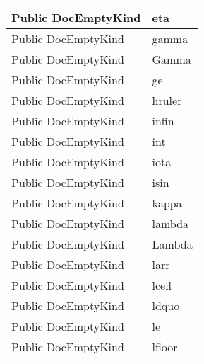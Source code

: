 \documentclass[11pt, oneside, a4paper]{book}
\begin{document}
\begin{center}
\begin{tabular}{| p{3cm} | p{12cm} | }
\hline
 Public  DocEmptyKind &  eta\hypertarget{SoftwareEngineeringTools.{}Documentation.{}DocEmptyKind.{}eta}{}\\
\hline
 Public  DocEmptyKind &  gamma\hypertarget{SoftwareEngineeringTools.{}Documentation.{}DocEmptyKind.{}gamma}{}\\
\hline
 Public  DocEmptyKind &  Gamma\hypertarget{SoftwareEngineeringTools.{}Documentation.{}DocEmptyKind.{}Gamma}{}\\
\hline
 Public  DocEmptyKind &  ge\hypertarget{SoftwareEngineeringTools.{}Documentation.{}DocEmptyKind.{}ge}{}\\
\hline
 Public  DocEmptyKind &  hruler\hypertarget{SoftwareEngineeringTools.{}Documentation.{}DocEmptyKind.{}hruler}{}\\
\hline
 Public  DocEmptyKind &  infin\hypertarget{SoftwareEngineeringTools.{}Documentation.{}DocEmptyKind.{}infin}{}\\
\hline
 Public  DocEmptyKind &  int\hypertarget{SoftwareEngineeringTools.{}Documentation.{}DocEmptyKind.{}int}{}\\
\hline
 Public  DocEmptyKind &  iota\hypertarget{SoftwareEngineeringTools.{}Documentation.{}DocEmptyKind.{}iota}{}\\
\hline
 Public  DocEmptyKind &  isin\hypertarget{SoftwareEngineeringTools.{}Documentation.{}DocEmptyKind.{}isin}{}\\
\hline
 Public  DocEmptyKind &  kappa\hypertarget{SoftwareEngineeringTools.{}Documentation.{}DocEmptyKind.{}kappa}{}\\
\hline
 Public  DocEmptyKind &  lambda\hypertarget{SoftwareEngineeringTools.{}Documentation.{}DocEmptyKind.{}lambda}{}\\
\hline
 Public  DocEmptyKind &  Lambda\hypertarget{SoftwareEngineeringTools.{}Documentation.{}DocEmptyKind.{}Lambda}{}\\
\hline
 Public  DocEmptyKind &  larr\hypertarget{SoftwareEngineeringTools.{}Documentation.{}DocEmptyKind.{}larr}{}\\
\hline
 Public  DocEmptyKind &  lceil\hypertarget{SoftwareEngineeringTools.{}Documentation.{}DocEmptyKind.{}lceil}{}\\
\hline
 Public  DocEmptyKind &  ldquo\hypertarget{SoftwareEngineeringTools.{}Documentation.{}DocEmptyKind.{}ldquo}{}\\
\hline
 Public  DocEmptyKind &  le\hypertarget{SoftwareEngineeringTools.{}Documentation.{}DocEmptyKind.{}le}{}\\
\hline
 Public  DocEmptyKind &  lfloor\hypertarget{SoftwareEngineeringTools.{}Documentation.{}DocEmptyKind.{}lfloor}{}\\

\end{tabular}
\end{center}
\end{document}
